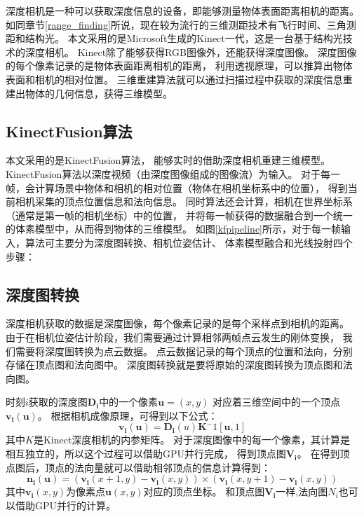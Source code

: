 深度相机是一种可以获取深度信息的设备，即能够测量物体表面距离相机的距离。
如同章节\ref{range_finding}所说，现在较为流行的三维测距技术有飞行时间、三角测距和结构光。
本文采用的是Microsoft生成的Kinect一代，这是一台基于结构光技术的深度相机。
Kinect除了能够获得RGB图像外，还能获得深度图像。
深度图像的每个像素记录的是物体表面距离相机的距离，
利用透视原理，可以推算出物体表面和相机的相对位置。
三维重建算法就可以通过扫描过程中获取的深度信息重建出物体的几何信息，获得三维模型。

\subsection{KinectFusion算法}
本文采用的是KinectFusion算法\cite{izadi2011kinectfusion}，
能够实时的借助深度相机重建三维模型。
KinectFusion算法\cite{izadi2011kinectfusion}以深度视频（由深度图像组成的图像流）为输入。
对于每一帧，会计算场景中物体和相机的相对位置（物体在相机坐标系中的位置），
得到当前相机采集的顶点位置信息和法向信息。
同时算法还会计算，相机在世界坐标系（通常是第一帧的相机坐标）中的位置，
并将每一帧获得的数据融合到一个统一的体素模型中，从而得到物体的三维模型。
如图\ref{kfpipeline}所示，对于每一帧输入，算法可主要分为深度图转换、相机位姿估计、
体素模型融合和光线投射四个步骤：

\subsection{深度图转换}
深度相机获取的数据是深度图像，每个像素记录的是每个采样点到相机的距离。
由于在相机位姿估计阶段，我们需要通过计算相邻两帧点云发生的刚体变换，
我们需要将深度图转换为点云数据。
点云数据记录的每个顶点的位置和法向，分别存储在顶点图和法向图中。
深度图转换就是要将原始的深度图转换为顶点图和法向图。

时刻$i$获取的深度图$\bm{D_i}$中的一个像素$\bm{u}=(x,y)$
对应着三维空间中的一个顶点$\bm{v_i}(\bm{u})$。
根据相机成像原理，可得到以下公式：
\begin{equation}
    \bm{v_i(u)}=\bm{D_i}(u)\bm{K}^-1[\bm{u},1]
\end{equation}
其中$K$是Kinect深度相机的内参矩阵。
对于深度图像中的每一个像素，其计算是相互独立的，所以这个过程可以借助GPU并行完成，
得到顶点图$\bm{V_i}$。
在得到顶点图后，顶点的法向量就可以借助相邻顶点的信息计算得到：
\begin{equation}
    \bm{n_i}(\bm{u})=(\bm{v_i}(x+1,y)-\bm{v_i}(x,y))\times(\bm{v_i}(x,y+1)-\bm{v_i}(x,y))
\end{equation}
其中$\bm{v_i}(x,y)$为像素点$\bm{u}(x,y)$对应的顶点坐标。
和顶点图$\bm{V_i}$一样,法向图$N_i$也可以借助GPU并行的计算。

